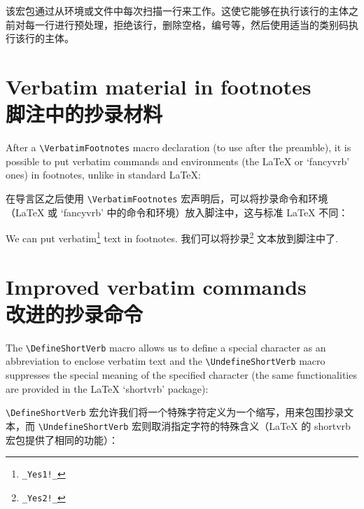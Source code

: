 \documentclass[twoside]{article}
\newcommand\FVrbPackage{`\textsf{fancyvrb}'}
\newcommand\cs[1]{\texttt{\textbackslash#1}}
\newcommand\verbatimTxt{抄录}
\begin{document}
该宏包通过从环境或文件中每次扫描一行来工作。这使它能够在执行该行的主体之前对每一行进行预处理，拒绝该行，删除空格，编号等，然后使用适当的类别码执行该行的主体。

% % 该软件包通过从环境或文件中一次扫描一行来工作。
% 该宏包对抄录环境或从文件中读取文本是，每次只扫描一行。 %
% 这样的方式允许它 to pre-process each line, rejecting it, 移除空格, numbering it, etc, 


\section{Verbatim material in footnotes\\脚注中的抄录材料}


After a \cs{VerbatimFootnotes} macro declaration (to use after the
preamble), it is possible to put verbatim commands and environments
(the \LaTeX{} or \FVrbPackage{} ones) in footnotes, unlike in standard
\LaTeX:

在导言区之后使用 \cs{VerbatimFootnotes} 宏声明后，可以将抄录命令和环境（\LaTeX{} 或 \FVrbPackage{} 中的命令和环境）放入脚注中，这与标准 \LaTeX{} 不同：

\begin{Example}
  \VerbatimFootnotes
  We can put verbatim\footnote{\verb+_Yes1!_+} text in footnotes.
  我们可以将抄录\footnote{\verb+_Yes2!_+} 文本放到脚注中了.
\end{Example}

\section{Improved verbatim commands\\改进的抄录命令}

The \cs{DefineShortVerb} macro allows us to define a special character as
an abbreviation to enclose verbatim text and the \cs{UndefineShortVerb}
macro suppresses the special meaning of the specified character (the same
functionalities are provided in the \LaTeX{} `\textsf{shortvrb}' package):

\cs{DefineShortVerb} 宏允许我们将一个特殊字符定义为一个缩写，用来包围抄录文本，而 \cs{UndefineShortVerb} 宏则取消指定字符的特殊含义（\LaTeX{} 的 \textsf{shortvrb} 宏包提供了相同的功能）：
%
\end{document}
